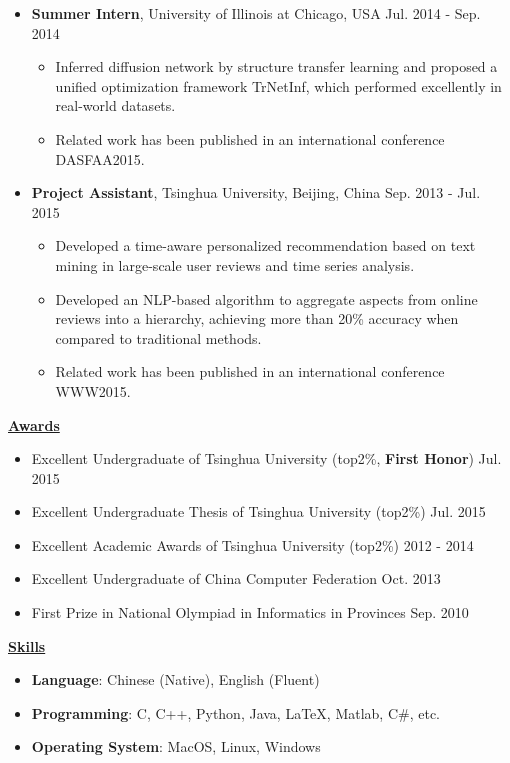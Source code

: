 \documentclass[11pt]{article}
\begin{document}
\begin{CJK}{GBK}{kai}
\begin{itemize}
   \item \textbf{Summer Intern}, University of Illinois at Chicago, USA \hfill Jul. 2014 - Sep. 2014\\
     \begin{itemize}
     \item Inferred diffusion network  by structure transfer learning and proposed a unified optimization framework TrNetInf, which performed excellently in real-world datasets.
     \item Related work has been published in an international conference DASFAA2015. \\\medskip
     \end{itemize}
  
   \item \textbf{Project Assistant}, Tsinghua University, Beijing, China \hfill Sep. 2013 - Jul. 2015\\
     \begin{itemize}
     \item Developed a time-aware personalized recommendation based on text mining in large-scale user reviews and time series analysis. 
     \item Developed an NLP-based algorithm to aggregate aspects from online reviews into a hierarchy, achieving more than 20\% accuracy when compared to traditional methods.
     \item Related work has been published in an international conference WWW2015.
     \end{itemize}
\end{itemize}


\bigskip

{ \textbf{\underline{Awards}}}\\
\begin{itemize}
\item Excellent Undergraduate of Tsinghua University (top2\%, \textbf{First Honor}) \hfill Jul. 2015
\item Excellent Undergraduate Thesis of Tsinghua University (top2\%) \hfill Jul. 2015
\item Excellent Academic Awards of Tsinghua University (top2\%) \hfill 2012 - 2014
\item Excellent Undergraduate of China Computer Federation \hfill Oct. 2013
\item First Prize in National Olympiad in Informatics in Provinces \hfill Sep. 2010
\end{itemize}

\bigskip

{ \textbf{\underline{Skills}}}
\begin{itemize}
    \item \textbf{Language}: Chinese (Native), English (Fluent)\\\smallskip
    \item \textbf{Programming}: C, C++, Python, Java, {\LaTeX},  Matlab, C\#, etc.\\\smallskip
    \item \textbf{Operating System}: MacOS, Linux, Windows
\end{itemize}

\end{CJK}
\end{document}
